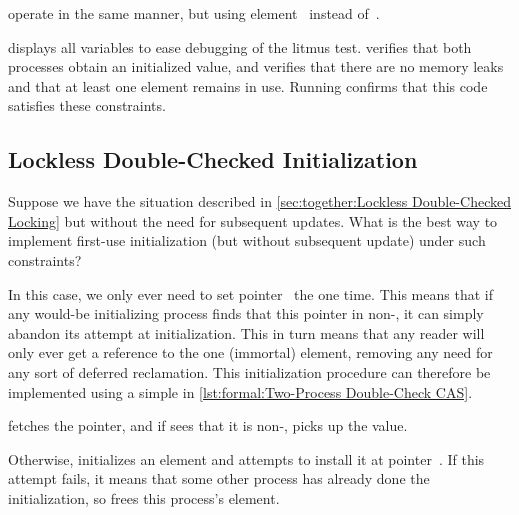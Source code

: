 \begin{fcvref}
 operate in the same manner, but using element~ instead
of~.

 displays all variables to ease debugging of the litmus test.
 verifies that both processes obtain an initialized value,
and  verifies that there are no memory leaks and that at least
one element remains in use.
Running  confirms that this code satisfies these constraints.
\end{fcvref}

\QuickQuizEnd

\subsection{Lockless Double-Checked Initialization}
\label{sec:together:Lockless Double-Checked Initialization}

Suppose we have the situation described in
\cref{sec:together:Lockless Double-Checked Locking}
but without the need for subsequent updates.
What is the best way to implement first-use initialization (but without
subsequent update) under such constraints?

\begin{listing}
\caption{Two-Process Double-Check CAS}
\label{lst:formal:Two-Process Double-Check CAS}
\end{listing}

In this case, we only ever need to set pointer~ the one time.
This means that if any would-be initializing process finds that
this pointer in non-, it can simply abandon its attempt at
initialization.
This in turn means that any reader will only ever get a reference to
the one (immortal) element, removing any need for any sort of deferred
reclamation.
This initialization procedure can therefore be implemented using a simple
 in \cref{lst:formal:Two-Process Double-Check CAS}.

\begin{fcvref}
 fetches the pointer, and if  sees that it is
non-,  picks up the value.

Otherwise,  initializes an element and 
attempts to install it at pointer~.
If this attempt fails, it means that some other process has already done
the initialization, so  frees this process's element.
\end{fcvref}

